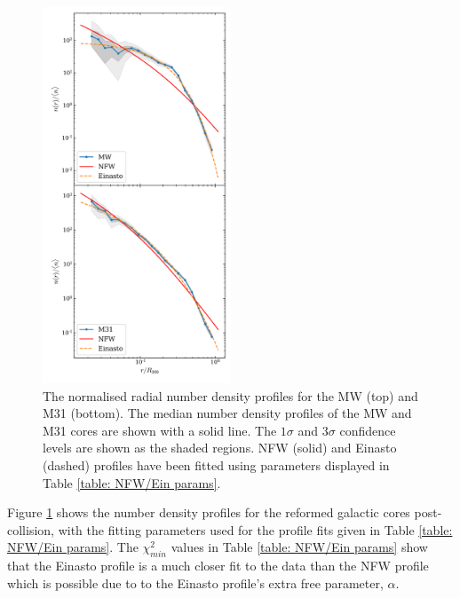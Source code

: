 \documentclass[10pt, twocolumn]{revtex4}    %
\begin{document}
\begin{figure}[h!]
\centering
\includegraphics[width=0.5\textwidth]{20180316_121626_n_DENSITY_M31_FIG_20_Gyrs}
\caption{The normalised radial number density profiles for the MW (top) and M31 (bottom). The median number density profiles of the MW and M31 cores are shown with a solid line. The $1\sigma$ and $3\sigma$ confidence levels are shown as the shaded regions. NFW (solid) and Einasto (dashed) profiles have been fitted using parameters displayed in Table \ref{table: NFW/Ein params}.}
\label{fig: n density MW}
\end{figure}

Figure \ref{fig: n density MW} shows the number density profiles for the reformed galactic cores post-collision, with the fitting parameters used for the profile fits given in Table \ref{table: NFW/Ein params}. The $\chi^2_{min}$ values in Table \ref{table: NFW/Ein params} show that the Einasto profile is a much closer fit to the data than the NFW profile which is possible due to to the Einasto profile's extra free parameter, $\alpha$.
\end{document}
